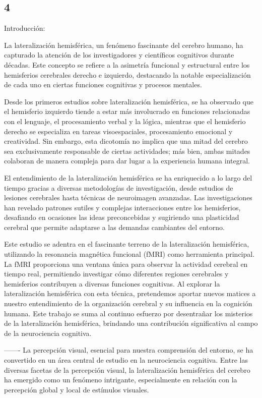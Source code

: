\documentclass{article}
\begin{document}
	\subsection{4}
	
	Introducción:
	
	La lateralización hemisférica, un fenómeno fascinante del cerebro humano, ha capturado la atención de los investigadores y científicos cognitivos durante décadas. Este concepto se refiere a la asimetría funcional y estructural entre los hemisferios cerebrales derecho e izquierdo, destacando la notable especialización de cada uno en ciertas funciones cognitivas y procesos mentales.
	
	Desde los primeros estudios sobre lateralización hemisférica, se ha observado que el hemisferio izquierdo tiende a estar más involucrado en funciones relacionadas con el lenguaje, el procesamiento verbal y la lógica, mientras que el hemisferio derecho se especializa en tareas visoespaciales, procesamiento emocional y creatividad. Sin embargo, esta dicotomía no implica que una mitad del cerebro sea exclusivamente responsable de ciertas actividades; más bien, ambas mitades colaboran de manera compleja para dar lugar a la experiencia humana integral.
	
	El entendimiento de la lateralización hemisférica se ha enriquecido a lo largo del tiempo gracias a diversas metodologías de investigación, desde estudios de lesiones cerebrales hasta técnicas de neuroimagen avanzadas. Las investigaciones han revelado patrones sutiles y complejas interacciones entre los hemisferios, desafiando en ocasiones las ideas preconcebidas y sugiriendo una plasticidad cerebral que permite adaptarse a las demandas cambiantes del entorno.
	
	Este estudio se adentra en el fascinante terreno de la lateralización hemisférica, utilizando la resonancia magnética funcional (fMRI) como herramienta principal. La fMRI proporciona una ventana única para observar la actividad cerebral en tiempo real, permitiendo investigar cómo diferentes regiones cerebrales y hemisferios contribuyen a diversas funciones cognitivas. Al explorar la lateralización hemisférica con esta técnica, pretendemos aportar nuevos matices a nuestro entendimiento de la organización cerebral y su influencia en la cognición humana. Este trabajo se suma al continuo esfuerzo por desentrañar los misterios de la lateralización hemisférica, brindando una contribución significativa al campo de la neurociencia cognitiva.
	
	-------
	La percepción visual, esencial para nuestra comprensión del entorno, se ha convertido en un área central de estudio en la neurociencia cognitiva. Entre las diversas facetas de la percepción visual, la lateralización hemisférica del cerebro ha emergido como un fenómeno intrigante, especialmente en relación con la percepción global y local de estímulos visuales.
	
\end{document}
